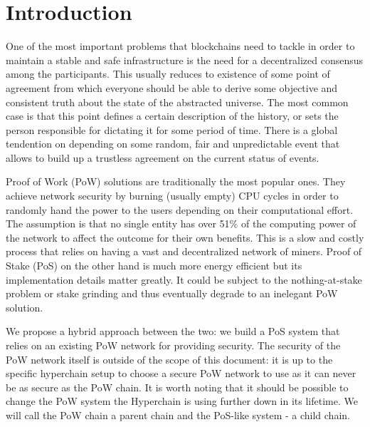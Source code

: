 \section{Introduction}

One of the most important problems that blockchains need to tackle in order to
maintain a stable and safe infrastructure is the need for a decentralized
consensus among the participants. This usually reduces to existence of some
point of agreement from which everyone should be able to derive some objective
and consistent truth about the state of the abstracted universe. The most common
case is that this point defines a certain description of the history, or sets
the person responsible for dictating it for some period of time. There is a
global tendention on depending on some random, fair and unpredictable event that
allows to build up a trustless agreement on the current status of events.

Proof of Work (PoW) solutions are traditionally the most popular ones.
They achieve network security by burning (usually empty) CPU cycles in order to
randomly hand the power to the users depending on their computational effort.
The assumption is that no single entity has over 51\%
of the computing power of the network to affect the outcome for their own
benefits. This is a slow and costly process that relies on having
a vast and decentralized network of miners. Proof of Stake (PoS) on the other
hand is much more energy efficient but its implementation details matter
greatly. It could be subject to the nothing-at-stake problem or stake grinding and
thus eventually degrade to an inelegant PoW solution.

We propose a hybrid approach between the two: we build a PoS system that
relies on an existing PoW network for providing security. The security of the
PoW network itself is outside of the scope of this document: it is up to
the specific hyperchain setup to choose a secure PoW network to use as it
can never be as secure as the PoW chain. It is worth noting that it should
be possible to change the PoW system the Hyperchain is using further down
in its lifetime. We will call the PoW chain a parent chain and the PoS-like
system - a child chain.

